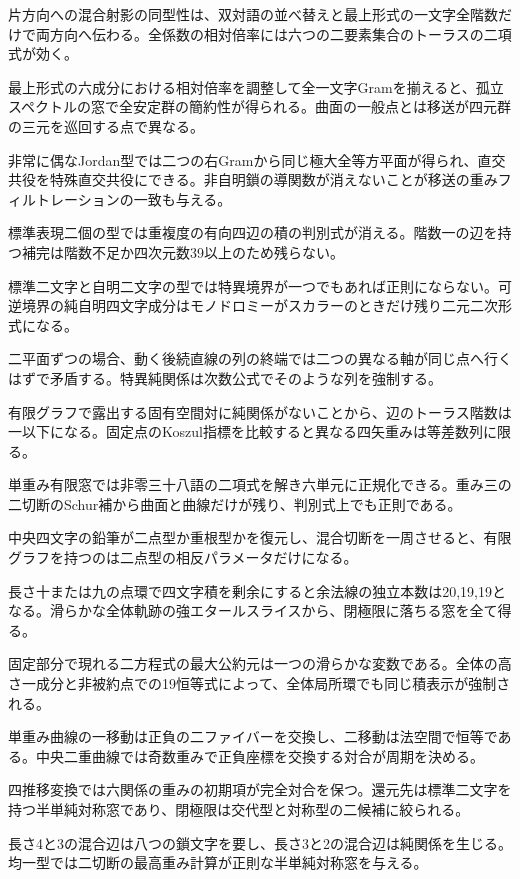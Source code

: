 \documentclass[11pt,a4paper]{ltjsarticle}
\begin{document}
片方向への混合射影の同型性は、双対語の並べ替えと最上形式の一文字全階数だけで両方向へ伝わる。全係数の相対倍率には六つの二要素集合のトーラスの二項式が効く。

最上形式の六成分における相対倍率を調整して全一文字Gramを揃えると、孤立スペクトルの窓で全安定群の簡約性が得られる。曲面の一般点とは移送が四元群の三元を巡回する点で異なる。

非常に偶なJordan型では二つの右Gramから同じ極大全等方平面が得られ、直交共役を特殊直交共役にできる。非自明鎖の導関数が消えないことが移送の重みフィルトレーションの一致も与える。

標準表現二個の型では重複度の有向四辺の積の判別式が消える。階数一の辺を持つ補完は階数不足か四次元数39以上のため残らない。

標準二文字と自明二文字の型では特異境界が一つでもあれば正則にならない。可逆境界の純自明四文字成分はモノドロミーがスカラーのときだけ残り二元二次形式になる。

二平面ずつの場合、動く後続直線の列の終端では二つの異なる軸が同じ点へ行くはずで矛盾する。特異純関係は次数公式でそのような列を強制する。

有限グラフで露出する固有空間対に純関係がないことから、辺のトーラス階数は一以下になる。固定点のKoszul指標を比較すると異なる四矢重みは等差数列に限る。

単重み有限窓では非零三十八語の二項式を解き六単元に正規化できる。重み三の二切断のSchur補から曲面と曲線だけが残り、判別式上でも正則である。

中央四文字の鉛筆が二点型か重根型かを復元し、混合切断を一周させると、有限グラフを持つのは二点型の相反パラメータだけになる。

長さ十または九の点環で四文字積を剰余にすると余法線の独立本数は20,19,19となる。滑らかな全体軌跡の強エタールスライスから、閉極限に落ちる窓を全て得る。

固定部分で現れる二方程式の最大公約元は一つの滑らかな変数である。全体の高さ一成分と非被約点での19恒等式によって、全体局所環でも同じ積表示が強制される。

単重み曲線の一移動は正負の二ファイバーを交換し、二移動は法空間で恒等である。中央二重曲線では奇数重みで正負座標を交換する対合が周期を決める。

四推移変換では六関係の重みの初期項が完全対合を保つ。還元先は標準二文字を持つ半単純対称窓であり、閉極限は交代型と対称型の二候補に絞られる。

長さ4と3の混合辺は八つの鎖文字を要し、長さ3と2の混合辺は純関係を生じる。均一型では二切断の最高重み計算が正則な半単純対称窓を与える。
\end{document}
